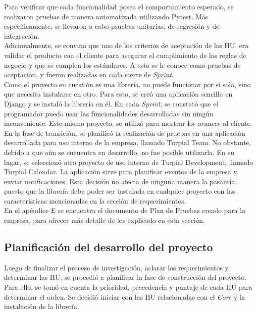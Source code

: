 Para verificar que cada funcionalidad posea el comportamiento esperado, se realizaron pruebas de manera automatizada utilizando Pytest. Más específicamente, se llevaron a cabo pruebas unitarias, de regresión y de integración. \\

Adicionalmente, se convino que uno de los criterios de aceptación de las HU, era validar el producto con el cliente para asegurar el cumplimiento de las reglas de negocio y que se cumplen los estándares. A esto se le conoce como pruebas de aceptación, y fueron realizadas en cada cierre de \textit{Sprint}.\\


Como el proyecto en cuestión es una librería, no puede funcionar por sí sola, sino que necesita instalarse en otro. Para esto, se creó una aplicación sencilla en Django y se instaló la librería en él. En cada \textit{Sprint}, se constató que el programador pueda usar las funcionalidades desarrolladas  sin ningún inconveniente. Este mismo proyecto, se utilizó para mostrar los avances al cliente. \\

En la fase de transición, se planificó la realización de pruebas en una aplicación desarrollada para uso interno de la empresa, llamado Turpial Team. No obstante, debido a que aún se encuentra en desarrollo, no fue posible utilizarla. En su lugar, se seleccionó otro proyecto de uso interno de Turpial Development, llamado Turpial Calendar. La aplicación sirve para planificar eventos de la empresa y enviar notificaciones. Esta decisión no afecta de ninguna manera la pasantía, puesto que la librería debe poder ser instalada en cualquier proyecto con las características mencionadas en la sección de requerimientos.\\

En el apéndice E se encuentra el documento de Plan de Pruebas creado para la empresa, para ofrecer más detalle de los explicado en esta sección.\\

\subsection{Planificación del desarrollo del proyecto}

Luego de finalizar el proceso de investigación, aclarar los requerimientos y determinar las HU, se procedió a planificar la fase de construcción del proyecto. Para ello, se tomó en cuenta la prioridad, precedencia y puntaje de cada HU para determinar el orden. Se decidió iniciar con las HU relacionadas con el \textit{Core} y la instalación de la librería.\\

